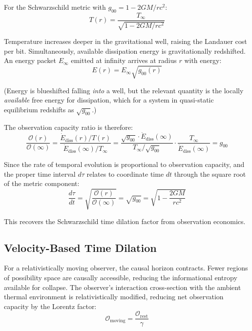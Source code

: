 \documentclass[12pt,a4paper]{article}
\begin{document}
For the Schwarzschild metric with $g_{00} = 1 - 2GM/rc^2$:
\begin{equation}
    T(r) = \frac{T_\infty}{\sqrt{1 - 2GM/rc^2}}
    \label{eq:tolman}
\end{equation}

Temperature increases deeper in the gravitational well, raising the Landauer cost per bit. Simultaneously, available dissipation energy is gravitationally redshifted. An energy packet $E_\infty$ emitted at infinity arrives at radius $r$ with energy:
\begin{equation}
    E(r) = E_\infty \sqrt{g_{00}(r)}
\end{equation}

(Energy is blueshifted falling \emph{into} a well, but the relevant quantity is the locally \emph{available} free energy for dissipation, which for a system in quasi-static equilibrium redshifts as $\sqrt{g_{00}}$.)

The observation capacity ratio is therefore:
\begin{equation}
    \frac{\mathcal{O}(r)}{\mathcal{O}(\infty)} = \frac{\dot{E}_{\mathrm{diss}}(r) / T(r)}{\dot{E}_{\mathrm{diss}}(\infty) / T_\infty} = \frac{\sqrt{g_{00}} \cdot \dot{E}_{\mathrm{diss}}(\infty)}{T_\infty / \sqrt{g_{00}}} \cdot \frac{T_\infty}{\dot{E}_{\mathrm{diss}}(\infty)} = g_{00}
    \label{eq:capacity_ratio}
\end{equation}

Since the rate of temporal evolution is proportional to observation capacity, and the proper time interval $d\tau$ relates to coordinate time $dt$ through the square root of the metric component:
\begin{equation}
    \boxed{\frac{d\tau}{dt} = \sqrt{\frac{\mathcal{O}(r)}{\mathcal{O}(\infty)}} = \sqrt{g_{00}} = \sqrt{1 - \frac{2GM}{rc^2}}}
    \label{eq:grav_dilation}
\end{equation}

This recovers the Schwarzschild time dilation factor from observation economics.

\subsection{Velocity-Based Time Dilation}

For a relativistically moving observer, the causal horizon contracts. Fewer regions of possibility space are causally accessible, reducing the informational entropy available for collapse. The observer's interaction cross-section with the ambient thermal environment is relativistically modified, reducing net observation capacity by the Lorentz factor:
\begin{equation}
    \mathcal{O}_{\mathrm{moving}} = \frac{\mathcal{O}_{\mathrm{rest}}}{\gamma}
\end{equation}
\end{document}

